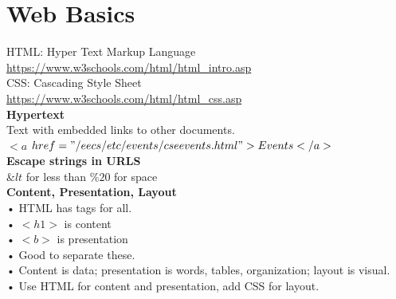 \documentclass{article}
\begin{document}
\section{Web Basics}
HTML: Hyper Text Markup Language\\
\url{https://www.w3schools.com/html/html_intro.asp }\\
CSS: Cascading Style Sheet\\
\url{https://www.w3schools.com/html/html_css.asp}\\
\large{\textbf{Hypertext}}\\
Text with embedded links to other documents.\\
$<a $ $href="/eecs/etc/events/cseevents.html">\\
Events\\
</a>$\\
\large{\textbf{Escape strings in URLS}}\\
\&$lt$ for less than \%$20$ for space\\
\large{\textbf{Content, Presentation, Layout}}\\
• HTML has tags for all.\\
• $<h1>$ is content\\
• $<b>$ is presentation \\
• Good to separate these.\\
• Content is data; presentation is words, tables, organization; layout is
visual.\\
• Use HTML for content and presentation, add CSS for layout.\\
\
\end{document}
